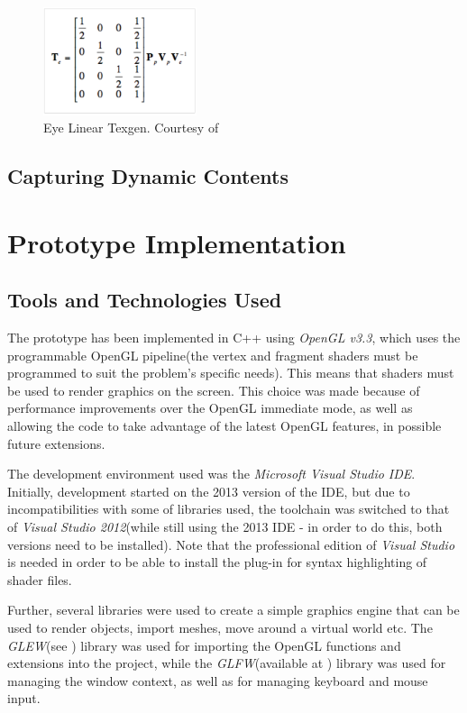 \documentclass[]{article}
\begin{document}
\begin{figure}[hbtp]
    \centering
    \includegraphics[width=0.4\textwidth]{figures/EyeLinearTexgen.PNG}
    \caption{Eye Linear Texgen. Courtesy of \cite{cassNvidia}}
    \label{fig:EyeLinearTexgen}
\end{figure}

\subsection{Capturing Dynamic Contents}
\newpage
\section{Prototype Implementation}

\subsection{Tools and Technologies Used}

The prototype has been implemented in C++ using \textit{OpenGL v3.3}, which uses the programmable OpenGL pipeline(the vertex and fragment shaders must be programmed to suit the problem's specific needs). This means that shaders must be used to render graphics on the screen. This choice was made because of performance improvements over the OpenGL immediate mode, as well as allowing the code to take advantage of the latest OpenGL features, in possible future extensions.

The development environment used was the \textit{Microsoft Visual Studio IDE}. Initially, development started on the 2013 version of the IDE, but due to incompatibilities with some of libraries used, the toolchain was switched to that of \textit{Visual Studio 2012}(while still using the 2013 IDE - in order to do this, both versions need to be installed). Note that the professional edition of \textit{Visual Studio} is needed in order to be able to install the plug-in for syntax highlighting of shader files.

Further, several libraries were used to create a simple graphics engine that can be used to render objects, import meshes, move around a virtual world etc. The \textit{GLEW}(see \cite{glew}) library was used for importing the OpenGL functions and extensions into the project, while the \textit{GLFW}(available at \cite{glfw}) library was used for managing the window context, as well as for managing keyboard and mouse input.
\end{document}
